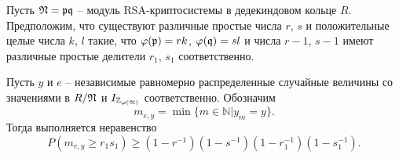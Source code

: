 \documentclass[_00_dissertation.tex]{subfiles}
\begin{document}
\begin{theorem}\label{theorem:iterated}
    Пусть $\mathfrak{N} = \mathfrak{p} \mathfrak{q}$ -- модуль RSA-криптосистемы в дедекиндовом кольце $R$.
    Предположим, что существуют различные простые числа $r$, $s$ и положительные целые числа $k$, $l$ такие, что $\varphi(\mathfrak{p}) = rk$, $\varphi(\mathfrak{q}) = sl$ и числа $r - 1$, $s - 1$ имеют различные простые делители $r_1$, $s_1$ соответственно.

    Пусть $y$ и $e$ -- независимые равномерно распределенные случайные величины со значениями в $R / \mathfrak{N}$ и $I_{\mathbb{Z}_{\varphi(\mathfrak{N})}}$ соответственно.
    Обозначим
    \begin{equation*}
        m_{e,y} = \min \{m \in \mathbb{N} | y_m = y\}.
    \end{equation*}
    Тогда выполняется неравенство
    \begin{equation*}
        P(m_{e,y} \ge r_1s_1)\ge(1-r^{-1})(1-s^{-1})(1-r_1^{-1})(1-s_1^{-1}).
    \end{equation*}
\end{theorem}
\end{document}
